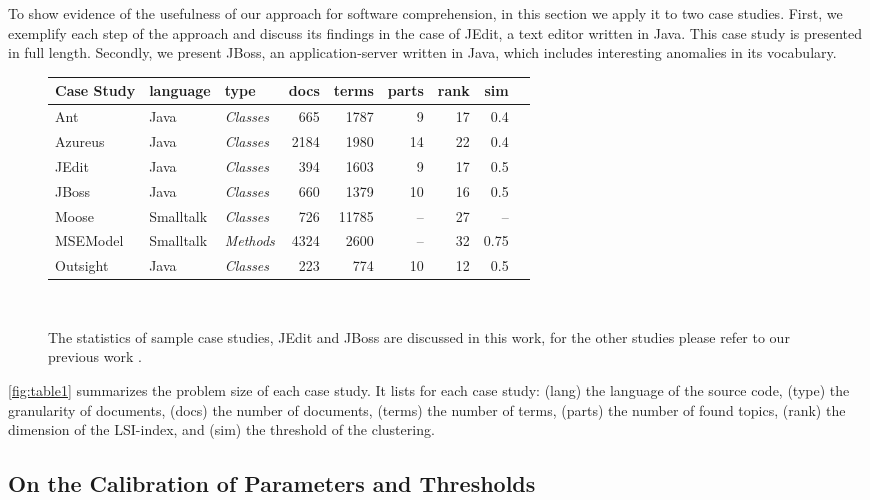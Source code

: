 To show evidence of the usefulness of our approach for software comprehension, in this section we apply it to two case studies. First, we exemplify each step of the approach and discuss its findings in the case of JEdit, a text editor written in Java. This case study is presented in full length. Secondly, we present JBoss, an application-server written in Java, which includes interesting anomalies in its vocabulary.

\begin{figure}[h]
\centering
{\scriptsize
\begin{tabular}{l|llrrrrrr}
\hline
\textbf{Case Study}&\textbf{language}&\textbf{type}&\textbf{docs}&\textbf{terms}
&\textbf{parts}&\textbf{rank}&\textbf{sim}\\
\hline
Ant & Java & \emph{Classes} & 665 & 1787 & 9 & 17 & 0.4\\
Azureus & Java & \emph{Classes}       & 2184 & 1980 & 14 & 22 & 0.4\\
JEdit & Java & \emph{Classes}       & 394  & 1603 & 9 & 17 & 0.5\\
JBoss & Java & \emph{Classes}       & 660 & 1379 & 10 & 16 & 0.5\\
Moose\footnotemark{} & Smalltalk & \emph{Classes}  & 726  & 11785 & -- & 27 & --\\
MSEModel & Smalltalk & \emph{Methods}  & 4324  & 2600 & -- & 32 & 0.75\\
Outsight & Java & \emph{Classes}    & 223 & 774 & 10 & 12 & 0.5\\
\hline
\end{tabular}}\\
\caption{The statistics of sample case studies, JEdit and JBoss are discussed in this work, for the other studies please refer to our previous work \cite{Kuhn05a,Kuhn06a}.}\label{fig:table1}
\end{figure}

\autoref{fig:table1} summarizes the problem size of each case study. It lists for each case study: (lang) the language of the source code, (type) the granularity of  documents, (docs) the number of documents, (terms) the number of terms, (parts) the number of found topics, (rank) the dimension of the LSI-index, and (sim) the threshold  of the clustering.

\subsection{On the Calibration of Parameters and Thresholds}\label{sec:parameters}

